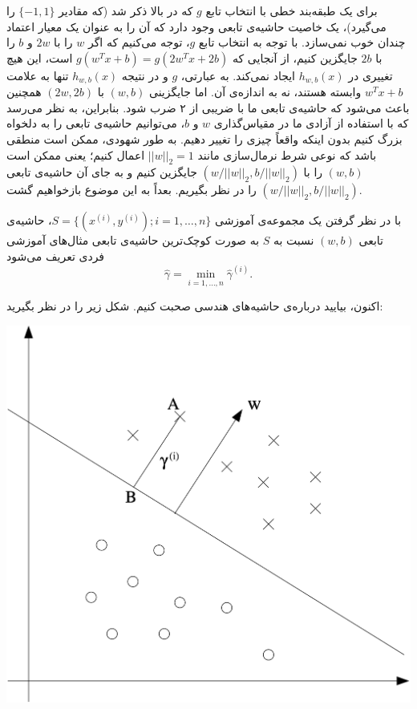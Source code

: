 \documentclass[12pt]{article}
\begin{document}
برای یک طبقه‌بند خطی با انتخاب تابع
$g$
که در بالا ذکر شد (که مقادیر
$\{-1, 1\}$
را می‌گیرد)، یک خاصیت حاشیه‌ی تابعی وجود دارد که آن را به عنوان یک معیار اعتماد چندان خوب نمی‌سازد. با توجه به انتخاب تابع
$g$،
توجه می‌کنیم که اگر
$w$
را با
$2w$
و
$b$
را با
$2b$
جایگزین کنیم، از آنجایی که
$g(w^T x + b) = g(2w^T x + 2b)$
است، این هیچ تغییری در
$h_{w,b}(x)$
ایجاد نمی‌کند. به عبارتی،
$g$
و در نتیجه
$h_{w,b}(x)$
تنها به علامت
$w^T x + b$
وابسته هستند، نه به اندازه‌ی آن. اما جایگزینی
$(w, b)$
با
$(2w, 2b)$
همچنین باعث می‌شود که حاشیه‌ی تابعی ما با ضریبی از ۲ ضرب شود. بنابراین، به نظر می‌رسد که با استفاده از آزادی ما در مقیاس‌گذاری
$w$
و
$b$،
می‌توانیم حاشیه‌ی تابعی را به دلخواه بزرگ کنیم بدون اینکه واقعاً چیزی را تغییر دهیم. به طور شهودی، ممکن است منطقی باشد که نوعی شرط نرمال‌سازی مانند
$||w||_2 = 1$
اعمال کنیم؛ یعنی ممکن است
$(w, b)$
را با
$(w/||w||_2, b/||w||_2)$
جایگزین کنیم و به جای آن حاشیه‌ی تابعی
$(w/||w||_2, b/||w||_2)$
را در نظر بگیریم. بعداً به این موضوع بازخواهیم گشت.

با در نظر گرفتن یک مجموعه‌ی آموزشی
$S = \{(x^{(i)}, y^{(i)}); i = 1, \ldots, n\}$،
حاشیه‌ی تابعی
$(w, b)$
نسبت به
$S$
به صورت کوچک‌ترین حاشیه‌ی تابعی مثال‌های آموزشی فردی تعریف می‌شود
$$\hat{\gamma} = \min_{i=1, \ldots, n} \hat{\gamma}^{(i)}.$$

اکنون، بیایید درباره‌ی حاشیه‌های هندسی صحبت کنیم. شکل زیر را در نظر بگیرید:
\begin{center}
    \includegraphics[scale=0.4]{figs/geo-margin.png}
\end{center}
\end{document}
